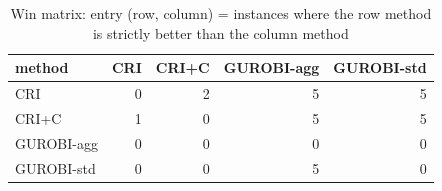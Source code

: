 \begin{table}[htbp]
\centering
\small
\caption{Win matrix: entry (row, column) = instances where the row method is strictly better than the column method}
\label{tab:E3x_long_runs_xlarge_b600_wins}
\begin{tabular}{lrrrr}
\toprule
method & CRI & CRI+C & GUROBI-agg & GUROBI-std \\
\midrule
CRI & 0 & 2 & 5 & 5 \\
CRI+C & 1 & 0 & 5 & 5 \\
GUROBI-agg & 0 & 0 & 0 & 0 \\
GUROBI-std & 0 & 0 & 5 & 0 \\
\bottomrule
\end{tabular}
\end{table}
